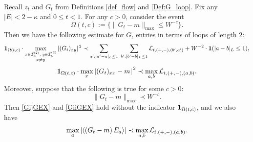 \begin{lemma}\label{lem_GbEXP}
Recall   $z_t$ and  $G_t$  from  Definitions \ref{def_flow} and \ref{Def:G_loop}. Fix any $|E|<2-\kappa$ and $0\leq t<1$. For any $c>0$, consider the event
\begin{equation}\label{def_asGMc}
    \Omega(t, c) := \big\{\|G_t - m\|_{\max} \leq W^{-c} \big\}.
\end{equation}
Then we have the following estimate for $G_{t}$ entries in terms of loops of length $2$:
\begin{equation}\label{GijGEX}
    {\bf 1}_{\Omega(t, c)} \cdot \max_{\substack{x \in {\cal I}^{(2)}_a,\; y \in {\cal I}^{(2)}_b\\ x\neq y}} |(G_t)_{xy}|^{\,2} \prec 
    \sum_{a':|a'-a|_{L}\leq1} \; \sum_{b':|b'-b|_{L}\leq1} {\cal L}_{t, (+,-), (b', a')}
    + W^{-2} \cdot {\bf 1}(|a - b|_{L} \leq 1),
\end{equation}
\begin{equation}\label{GiiGEX}
    {\bf 1}_{\Omega(t, c)} \cdot \max_{x} \left|(G_t)_{xx} - m\right|^{\,2} \prec \max_{a, b} {\cal L}_{t, (+,-), (a, b)}.
\end{equation}
Moreover, suppose that the following is true for some $c > 0$:
\begin{equation}\label{asGMc} 
    \|G_t - m\|_{\max} \prec W^{-c}.
\end{equation}
Then \eqref{GijGEX} and \eqref{GiiGEX} hold without the indicator ${\bf 1}_{\Omega(t, c)}$, and we also have
\begin{equation}\label{GavLGEX}
    \max_{a} \left| \left\langle \left(G_t - m\right) E_a \right\rangle \right| \prec \max_{a, b} {\cal L}_{t, (+,-), (a, b)}.
\end{equation} 
\end{lemma}


